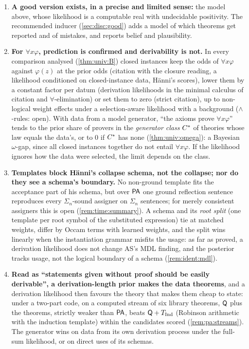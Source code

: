 \begin{enumerate}[label=\textbf{A\arabic*.},leftmargin=*,itemsep=1pt]
\item \textbf{A good version exists, in a precise and limited sense:} the model above, whose likelihood is a computable real with undecidable positivity. The recommended inducer (\cref{sec:disc:good}) adds a model of which theorems get reported and of mistakes, and reports belief and plausibility.

\item \textbf{For $\forall x\varphi$, prediction is confirmed and derivability is not.} In every comparison analysed (\cref{thm:univ:B}) closed instances keep the odds of $\forall x\varphi$ against $\varphi(z)$ at the prior odds (citation with the closure reading, a likelihood conditioned on closed-instance data, H\"anni's scores), lower them by a constant factor per datum (derivation likelihoods in the minimal calculus of citation and $\forall$-elimination) or set them to zero (strict citation), up to non-logical weight effects under a selection-aware likelihood with a background ($\wedge$-rules: open). With data from a model generator, ``the axioms prove $\forall x\varphi$'' tends to the prior share of provers in the \emph{generator class} $C^{*}$ of theories whose law equals the data's, or to $0$ if $C^{*}$ has none (\cref{thm:univ:omega}): a Bayesian $\omega$-gap, since all closed instances together do not entail $\forall x\varphi$. If the likelihood ignores how the data were selected, the limit depends on the class.

\item \textbf{Templates block H\"anni's collapse schema, not the collapse; nor do they see a schema's boundary.} No non-ground template fits the acceptance part of his schema, but over $\mathsf{PA}$ one ground reflection sentence reproduces every $\Sigma_n$-sound assigner on $\Sigma_n$ sentences; for merely consistent assigners this is open (\cref{rem:time:summary}). A schema and its \emph{root split} (one template per root symbol of the substituted expression) tie at matched weights, differ by Occam terms with learned weights, and the split wins linearly when the instantiation grammar misfits the usage: as far as proved, a derivation likelihood does not change AS's MDL finding, and the posterior tracks usage, not the logical boundary of a schema (\cref{rem:ident:mdl}).

\item \textbf{Read as ``statements given without proof should be easily derivable'', a derivation-length prior makes the data theorems}, and a derivation likelihood then favours the theory that makes them cheap to state: under a two-part code, on a computed stream of six library theorems, $\mathsf{Q}$ plus the theorems, strictly weaker than $\mathsf{PA}$, beats $\mathsf{Q}+T_{\mathrm{Ind}}$ (Robinson arithmetic with the induction template) within the candidates scored (\cref{rem:pa:streams}). The generator wins on data from its own derivation process under the full-sum likelihood, or on direct uses of its schemas.


\end{enumerate}
